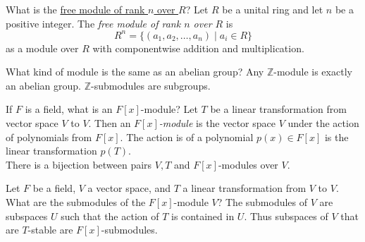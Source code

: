\documentclass[avery5371,grid]{flashcards}
\newcommand{\Z}{\mathbb{Z}}
\newcommand{\rmod}{$R$-module}
\begin{document}
\begin{flashcard}[Modules]{What is the \underline{free module of rank $n$ over $R$}?}
 Let $R$ be a unital ring and let $n$ be a positive integer. The \emph{free module of rank $n$ over $R$} is
 $$
 R^n = \{(a_1, a_2, \ldots, a_n) \mid a_i \in R \}
 $$
 as a module over $R$ with componentwise addition and multiplication.
\end{flashcard}

\begin{flashcard}[Modules]{What kind of module is the same as an abelian group?}
 Any $\Z$-module is exactly an abelian group. $\Z$-submodules are subgroups.
\end{flashcard}

\begin{flashcard}[Modules]{If $F$ is a field, what is an $F[x]$-module?}
 Let $T$ be a linear transformation from vector space $V$ to $V$. Then an \emph{$F[x]$-module} is the vector space $V$ under the action of polynomials from $F[x]$. The action is of a polynomial $p(x) \in F[x]$ is the linear transformation $p(T)$.\\
 
 There is a bijection between pairs $V,T$ and $F[x]$-modules over $V$.
\end{flashcard}

\begin{flashcard}[Modules]{Let $F$ be a field, $V$ a vector space, and $T$ a linear transformation from $V$ to $V$. What are the submodules of the $F[x]$-module $V$?}
 The submodules of $V$ are subspaces $U$ such that the action of $T$ is contained in $U$. Thus subspaces of $V$ that are $T$-stable are $F[x]$-submodules.
\end{flashcard}

\end{document}

